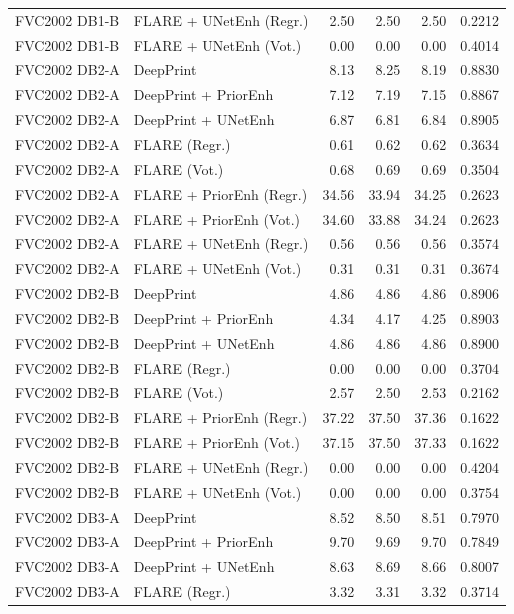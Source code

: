 {\begin{longtable}{llrrrr}
FVC2002 DB1-B & FLARE + UNetEnh (Regr.) & 2.50 & 2.50 & 2.50 & 0.2212 \\
FVC2002 DB1-B & FLARE + UNetEnh (Vot.) & 0.00 & 0.00 & 0.00 & 0.4014 \\
\midrule
FVC2002 DB2-A & DeepPrint & 8.13 & 8.25 & 8.19 & 0.8830 \\
FVC2002 DB2-A & DeepPrint + PriorEnh & 7.12 & 7.19 & 7.15 & 0.8867 \\
FVC2002 DB2-A & DeepPrint + UNetEnh & 6.87 & 6.81 & 6.84 & 0.8905 \\
FVC2002 DB2-A & FLARE (Regr.) & 0.61 & 0.62 & 0.62 & 0.3634 \\
FVC2002 DB2-A & FLARE (Vot.) & 0.68 & 0.69 & 0.69 & 0.3504 \\
FVC2002 DB2-A & FLARE + PriorEnh (Regr.) & 34.56 & 33.94 & 34.25 & 0.2623 \\
FVC2002 DB2-A & FLARE + PriorEnh (Vot.) & 34.60 & 33.88 & 34.24 & 0.2623 \\
FVC2002 DB2-A & FLARE + UNetEnh (Regr.) & 0.56 & 0.56 & 0.56 & 0.3574 \\
FVC2002 DB2-A & FLARE + UNetEnh (Vot.) & 0.31 & 0.31 & 0.31 & 0.3674 \\
\midrule
FVC2002 DB2-B & DeepPrint & 4.86 & 4.86 & 4.86 & 0.8906 \\
FVC2002 DB2-B & DeepPrint + PriorEnh & 4.34 & 4.17 & 4.25 & 0.8903 \\
FVC2002 DB2-B & DeepPrint + UNetEnh & 4.86 & 4.86 & 4.86 & 0.8900 \\
FVC2002 DB2-B & FLARE (Regr.) & 0.00 & 0.00 & 0.00 & 0.3704 \\
FVC2002 DB2-B & FLARE (Vot.) & 2.57 & 2.50 & 2.53 & 0.2162 \\
FVC2002 DB2-B & FLARE + PriorEnh (Regr.) & 37.22 & 37.50 & 37.36 & 0.1622 \\
FVC2002 DB2-B & FLARE + PriorEnh (Vot.) & 37.15 & 37.50 & 37.33 & 0.1622 \\
FVC2002 DB2-B & FLARE + UNetEnh (Regr.) & 0.00 & 0.00 & 0.00 & 0.4204 \\
FVC2002 DB2-B & FLARE + UNetEnh (Vot.) & 0.00 & 0.00 & 0.00 & 0.3754 \\
\midrule
FVC2002 DB3-A & DeepPrint & 8.52 & 8.50 & 8.51 & 0.7970 \\
FVC2002 DB3-A & DeepPrint + PriorEnh & 9.70 & 9.69 & 9.70 & 0.7849 \\
FVC2002 DB3-A & DeepPrint + UNetEnh & 8.63 & 8.69 & 8.66 & 0.8007 \\
FVC2002 DB3-A & FLARE (Regr.) & 3.32 & 3.31 & 3.32 & 0.3714 \\

\end{longtable}}
